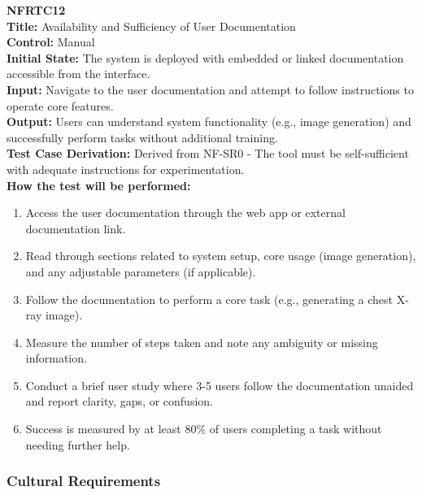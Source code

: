 \documentclass[12pt, titlepage]{article}
\begin{document}
\textbf{NFRTC12}\\
\textbf{Title:} Availability and Sufficiency of User Documentation\\
\textbf{Control:} Manual\\
\textbf{Initial State:} The system is deployed with embedded or linked documentation accessible from the interface.\\
\textbf{Input:} Navigate to the user documentation and attempt to follow instructions to operate core features.\\
\textbf{Output:} Users can understand system functionality (e.g., image generation) and successfully perform tasks without additional training.\\
\textbf{Test Case Derivation:} Derived from NF-SR0 - The tool must be self-sufficient with adequate instructions for experimentation.\\
\textbf{How the test will be performed:}
\begin{enumerate}
  \item Access the user documentation through the web app or external documentation link.
  \item Read through sections related to system setup, core usage (image generation), and any adjustable parameters (if applicable).
  \item Follow the documentation to perform a core task (e.g., generating a chest X-ray image).
  \item Measure the number of steps taken and note any ambiguity or missing information.
  \item Conduct a brief user study where 3-5 users follow the documentation unaided and report clarity, gaps, or confusion.
  \item Success is measured by at least 80\% of users completing a task without needing further help.
\end{enumerate}
\vspace{1em}

\subsubsection{Cultural Requirements}
\end{document}
